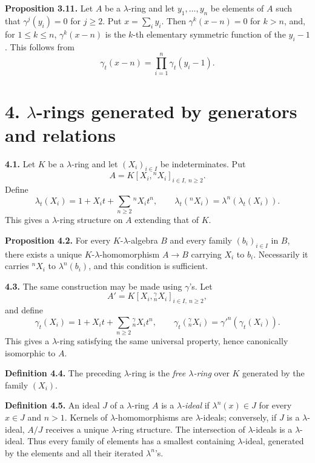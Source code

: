 \textbf{Proposition 3.11.} Let \(A\) be a \(\lambda\)-ring and let \(y_1,\ldots,y_n\) be elements of \(A\) such that \(\gamma^j(y_i)=0\) for \(j\ge2\). Put \(x=\sum_i y_i\). Then \(\gamma^k(x-n)=0\) for \(k>n\), and, for \(1\le k\le n\), \(\gamma^k(x-n)\) is the \(k\)-th elementary symmetric function of the \(y_i-1\). This follows from
\[
  \gamma_t(x-n)=\prod_{i=1}^{n}\gamma_t(y_i-1).
\]

\section*{4. \(\lambda\)-rings generated by generators and relations}

\textbf{4.1.} Let \(K\) be a \(\lambda\)-ring and let \((X_i)_{i\in I}\) be indeterminates. Put
\[
  A=K[X_i,{}^nX_i]_{i\in I,\ n\ge2}.
\]
Define
\begin{equation}\tag{4.1.1}
  \lambda_t(X_i)=1+X_it+\sum_{n\ge2}{}^nX_i t^n,
  \qquad
  \lambda_t({}^nX_i)=\lambda^n(\lambda_t(X_i)).
\end{equation}
This gives a \(\lambda\)-ring structure on \(A\) extending that of \(K\).

\textbf{Proposition 4.2.} For every \(K\)-\(\lambda\)-algebra \(B\) and every family \((b_i)_{i\in I}\) in \(B\), there exists a unique \(K\)-\(\lambda\)-homomorphism \(A\to B\) carrying \(X_i\) to \(b_i\). Necessarily it carries \({}^nX_i\) to \(\lambda^n(b_i)\), and this condition is sufficient.

\textbf{4.3.} The same construction may be made using \(\gamma\)'s. Let
\[
  A'=K[X_i,{}^\gamma_nX_i]_{i\in I,\ n\ge2},
\]
and define
\begin{equation}\tag{4.3.1}
  \gamma_t(X_i)=1+X_it+\sum_{n\ge2}{}^\gamma_nX_i t^n,
  \qquad
  \gamma_t({}^\gamma_nX_i)=\gamma'^n(\gamma_t(X_i)).
\end{equation}
This gives a \(\lambda\)-ring satisfying the same universal property, hence canonically isomorphic to \(A\).

\textbf{Definition 4.4.} The preceding \(\lambda\)-ring is the \emph{free \(\lambda\)-ring} over \(K\) generated by the family \((X_i)\).

\textbf{Definition 4.5.} An ideal \(J\) of a \(\lambda\)-ring \(A\) is a \emph{\(\lambda\)-ideal} if \(\lambda^n(x)\in J\) for every \(x\in J\) and \(n>1\). Kernels of \(\lambda\)-homomorphisms are \(\lambda\)-ideals; conversely, if \(J\) is a \(\lambda\)-ideal, \(A/J\) receives a unique \(\lambda\)-ring structure. The intersection of \(\lambda\)-ideals is a \(\lambda\)-ideal. Thus every family of elements has a smallest containing \(\lambda\)-ideal, generated by the elements and all their iterated \(\lambda^n\)'s.

